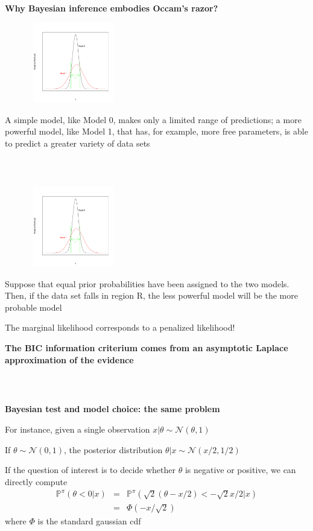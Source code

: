 \documentclass[notes,professionalfont,11pt,usenames,dvipsnames]{beamer}
\renewcommand{\mathcal}{\mathscr}
\renewcommand{\mathcal}{\mathscr}
\renewcommand{\P}{\mathbb{P}}
\newcommand\justify{\rightskip0pt \leftskip0pt}
\newenvironment{slide}
{\begin{frame}[environment=slide]
\frametitle{\insertsection \\ \insertsubsection}\justify\setlength{\parskip}{0.5cm}\vspace{-1.5cm}}
{\end{frame}}
\begin{document}
\begin{slide}

\textbf{Why Bayesian inference embodies Occam's razor?}


\centerline{\includegraphics[width=6cm,height=3.5cm]{evidence}}

A simple model, like Model 0, makes only a limited range of predictions; a more powerful model, like Model 1,
that has, for example, more free parameters, is able to predict a greater variety of data sets

\end{slide}

\begin{slide}

\centerline{\includegraphics[width=6cm,height=3.5cm]{evidence}}


Suppose that equal prior probabilities have been assigned to the two models. Then, if the data set falls in region R,
the less powerful model will be the more probable model

The marginal likelihood corresponds to a penalized likelihood!

\textbf{\color{red} The BIC information criterium comes from an asymptotic Laplace approximation of the evidence}

\end{slide}

\begin{slide}

\textbf{Bayesian test and model choice: the same problem}

For instance, given a single observation $x|\theta \sim \mathcal{N}(\theta,1)$ 

If $\theta\sim\mathcal{N}(0,1)$, the posterior distribution $\theta|x\sim\mathcal{N}(x/2,1/2)$

If the question of interest is to decide whether $\theta$ is negative or positive, we can directly compute
\begin{eqnarray*}
\P^\pi(\theta<0|x) & = & \P^\pi\left({\sqrt{2}(\theta-x/2)} < {-\sqrt{2}x/2}|x\right) \nonumber\\
                   & = & \Phi\left(-x/\sqrt{2}\right)
\end{eqnarray*}
where $\Phi$ is the standard gaussian cdf

\end{slide}
\end{document}
